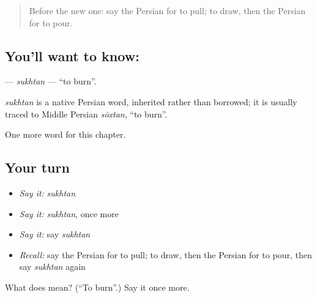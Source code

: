 \label{lesson:FA-C132-sukhtan}



\begin{quote}
Before the new one: say the Persian for to pull; to draw, then the Persian for to pour.
\end{quote}

\subsection*{You'll want to know: }
\textbf{} — \emph{sukhtan} — \textquotedblleft{}to burn\textquotedblright{}.

\begin{cousinweb}
\emph{sukhtan} is a native Persian word, inherited rather than borrowed; it is usually traced to Middle Persian \emph{sōxtan}, \textquotedblleft{}to burn\textquotedblright{}.
\end{cousinweb}

\begin{grammarlens}[title={What you've built}]
One more word for this chapter.
\end{grammarlens}

\subsection*{Your turn}
\begin{itemize}
\raggedright
  \item \emph{Say it:} \emph{sukhtan}
  \item \emph{Say it:} \emph{sukhtan}, once more
  \item \emph{Say it:} say \emph{sukhtan}
  \item \emph{Recall:} say the Persian for to pull; to draw, then the Persian for to pour, then say \emph{sukhtan} again
\end{itemize}

\begin{tcolorbox}[breakable,colback=teal!4,colframe=teal!35!black,title={Before you move on}]
What does  mean? (\textquotedblleft{}To burn\textquotedblright{}.) Say it once more.
\end{tcolorbox}

